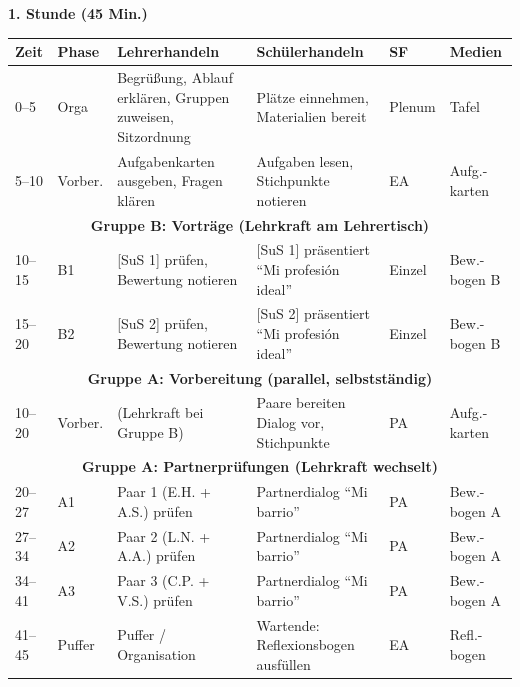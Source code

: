 \documentclass[11pt,a4paper]{article}
\begin{document}
\vspace{1em}
\textbf{1. Stunde (45 Min.)}

\begin{longtable}{|p{1.2cm}|p{1.5cm}|p{4cm}|p{4cm}|p{1.5cm}|p{1.5cm}|}
\hline
\textbf{Zeit} & \textbf{Phase} & \textbf{Lehrerhandeln} & \textbf{Schülerhandeln} & \textbf{SF} & \textbf{Medien} \\
\hline
\endhead

0--5 & Orga & Begrüßung, Ablauf erklären, Gruppen zuweisen, Sitzordnung & Plätze einnehmen, Materialien bereit & Plenum & Tafel \\
\hline

5--10 & Vorber. & Aufgabenkarten ausgeben, Fragen klären & Aufgaben lesen, Stichpunkte notieren & EA & Aufg.-karten \\
\hline

\multicolumn{6}{|c|}{\textbf{Gruppe B: Vorträge (Lehrkraft am Lehrertisch)}} \\
\hline

10--15 & B1 & [SuS 1] prüfen, Bewertung notieren & [SuS 1] präsentiert ``Mi profesión ideal'' & Einzel & Bew.-bogen B \\
\hline

15--20 & B2 & [SuS 2] prüfen, Bewertung notieren & [SuS 2] präsentiert ``Mi profesión ideal'' & Einzel & Bew.-bogen B \\
\hline

\multicolumn{6}{|c|}{\textbf{Gruppe A: Vorbereitung (parallel, selbstständig)}} \\
\hline

10--20 & Vorber. & (Lehrkraft bei Gruppe B) & Paare bereiten Dialog vor, Stichpunkte & PA & Aufg.-karten \\
\hline

\multicolumn{6}{|c|}{\textbf{Gruppe A: Partnerprüfungen (Lehrkraft wechselt)}} \\
\hline

20--27 & A1 & Paar 1 (E.H. + A.S.) prüfen & Partnerdialog ``Mi barrio'' & PA & Bew.-bogen A \\
\hline

27--34 & A2 & Paar 2 (L.N. + A.A.) prüfen & Partnerdialog ``Mi barrio'' & PA & Bew.-bogen A \\
\hline

34--41 & A3 & Paar 3 (C.P. + V.S.) prüfen & Partnerdialog ``Mi barrio'' & PA & Bew.-bogen A \\
\hline

41--45 & Puffer & Puffer / Organisation & Wartende: Reflexionsbogen ausfüllen & EA & Refl.-bogen \\
\hline
\end{longtable}
\end{document}
